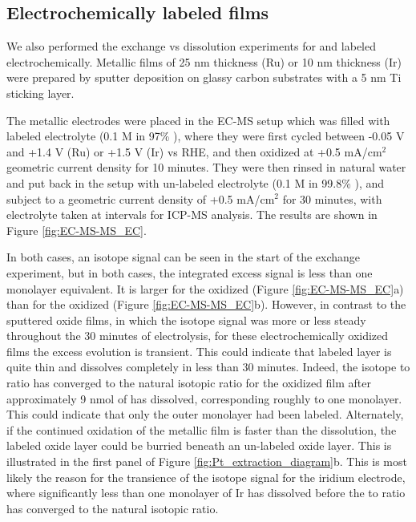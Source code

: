 \subsection{Electrochemically labeled films}

We also performed the exchange vs dissolution experiments for  and  labeled electrochemically. Metallic films of 25 nm thickness (Ru) or 10 nm thickness (Ir) were prepared by sputter deposition on glassy carbon substrates with a 5 nm Ti sticking layer.

The metallic electrodes were placed in the EC-MS setup which was filled with labeled electrolyte (0.1 M  in 97\% ), where they were first cycled between -0.05 V and +1.4 V (Ru) or +1.5 V (Ir) vs RHE, and then oxidized at +0.5 mA/cm$^2$ geometric current density for 10 minutes. They were then rinsed in natural water and put back in the setup with un-labeled electrolyte (0.1 M  in 99.8\% ), and subject to a geometric current density of +0.5 mA/cm$^2$ for 30 minutes, with electrolyte taken at intervals for ICP-MS analysis. The results are shown in Figure \ref{fig:EC-MS-MS_EC}.

In both cases, an isotope signal can be seen in the start of the exchange experiment, but in both cases, the integrated excess  signal is less than one monolayer equivalent. It is larger for the oxidized  (Figure \ref{fig:EC-MS-MS_EC}a) than for the oxidized  (Figure \ref{fig:EC-MS-MS_EC}b). However, in contrast to the sputtered oxide films, in which the isotope signal was more or less steady throughout the 30 minutes of electrolysis, for these electrochemically oxidized films the excess  evolution is transient. This could indicate that labeled layer is quite thin and dissolves completely in less than 30 minutes. Indeed, the isotope  to  ratio has converged to the natural isotopic ratio for the oxidized  film after approximately 9 nmol of  has dissolved, corresponding roughly to one monolayer. This could indicate that only the outer monolayer had been labeled. Alternately, if the continued oxidation of the metallic film is faster than the dissolution, the labeled oxide layer could be burried beneath an un-labeled oxide layer. This is illustrated in the first panel of Figure \ref{fig:Pt_extraction_diagram}b. This is most likely the reason for the transience of the isotope signal for the iridium electrode, where significantly less than one monolayer of Ir has dissolved before the  to  ratio has converged to the natural isotopic ratio.

